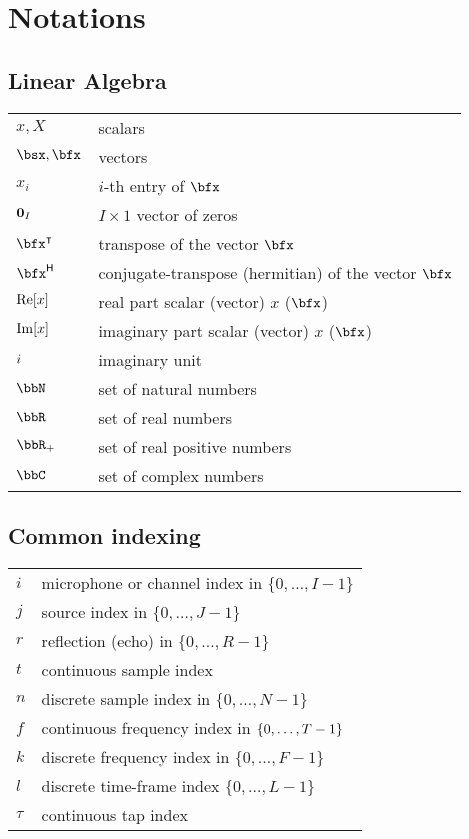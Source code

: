\chapter*{Notations}\label{ch:notation}


\section*{Linear Algebra}
\begin{table}[H]
    \begin{tabular}{ll}
        $x, X$     & scalars      \\
        $\bsx, \bfx$  & vectors      \\
        $x_i$   & $i$-th entry of $\bfx$ \\
        $\mathbf{0}_I$ & $I\times1$ vector of zeros\\
        $\ktranspose{\bfx}$   & transpose of the vector $\bfx$ \\
        $\khermitian{\bfx}$   & conjugate-transpose (hermitian) of the vector $\bfx$ \\
        $\operatorname{Re}[x]$ & real part scalar (vector) $x$ ($\bfx$) \\
        $\operatorname{Im}[x]$ & imaginary part scalar (vector) $x$ ($\bfx$) \\
        ${i}$  & imaginary unit \\
        $\bbN$    & set of natural numbers \\
        $\bbR$    & set of real numbers \\
        $\bbR_{+}$  & set of real positive numbers \\
        $\bbC$      & set of complex numbers \\
    \end{tabular}
\end{table}

\section*{Common indexing}
\begin{table}[H]
    \begin{tabular}{ll}
        $i$     & microphone or channel index in $\{0, \ldots, I-1\}$      \\
        $j$     & source index in $\{0, \ldots, J-1\}$      \\
        $r$     & reflection (echo) in $\{0, \ldots, R-1\}$      \\
        $t$     & continuous sample index\\
        $n$     & discrete sample index in $\{0, \ldots, N-1\}$ \\
        $f$     & continuous frequency index in $\set{0, \ldots, T-1}$\\
        $k$     & discrete frequency index in $\{0, \ldots, F-1\}$ \\
        $l$     & discrete time-frame index $\{0, \ldots, L-1\}$\\
        $\tau$  & continuous tap index
    \end{tabular}
\end{table}

